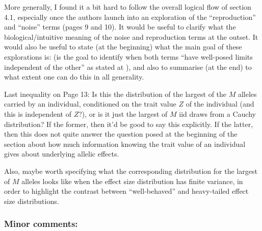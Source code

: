 
\begin{point}{}
More generally, I found it a bit hard to follow the overall logical flow of section 4.1, especially once the authors launch into an exploration of the ``reproduction'' and ``noise'' terms (pages 9 and 10).
    It would be useful to clarify what the biological/intuitive meaning of the noise and reproduction terms at the outset. It would also be useful to state (at the beginning) what the main goal of these explorations is: (is the goal to identify when both terms ``have well-posed limits independent of the other'' as stated at ), and also to summarise (at the end) to what extent one can do this in all generality.
\end{point}

\reply{
}


\begin{point}{}
    Last inequality on Page 13: Is this the distribution of the largest of the $M$ alleles carried by an individual, conditioned on the trait value $Z$ of the individual (and this is independent of $Z$?), or is it just the largest of $M$ iid draws from a Cauchy distribution? If the former, then it'd be good to say this explicitly. If the latter, then this does not quite answer the question posed at the beginning of the section about how much information knowing the trait value of an individual gives about underlying allelic effects.
\end{point}

\reply{
}

\begin{point}{}
Also, maybe worth specifying what the corresponding distribution for the largest of $M$ alleles looks like when the effect size distribution has finite variance, in order to highlight the contrast between ``well-behaved'' and heavy-tailed effect size distributions.
\end{point}


\subsubsection*{Minor comments:}

